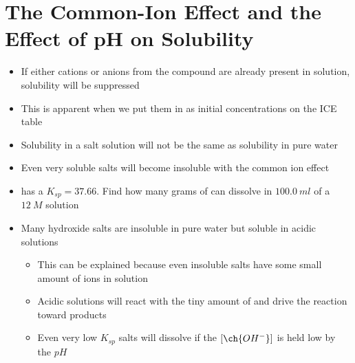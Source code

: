 \documentclass[12pt, openany, letterpaper]{memoir}
\begin{document}
\section{The Common-Ion Effect and the Effect of pH on Solubility}
\begin{itemize}
	\item If either cations or anions from the compound are already present in solution, solubility will be suppressed
	\item This is apparent when we put them in as initial concentrations on the ICE table
	\item Solubility in a salt solution will not be the same as solubility in pure water
	\item Even very soluble salts will become insoluble with the common ion effect
	\item {} has a $K_{sp} = 37.66$. Find how many grams of  can dissolve in $100.0~ml$ of a $12~M$  solution
	\item Many hydroxide salts are insoluble in pure water but soluble in acidic solutions
	\begin{itemize}
		\item This can be explained because even insoluble salts have some small amount of ions in solution
		\item Acidic solutions will react with the tiny amount of  and drive the reaction toward products
		\item Even very low $K_{sp}$ salts will dissolve if the $\left[\ch{OH^-}\right]$ is held low by the $pH$
	\end{itemize}
\end{itemize}
\end{document}
